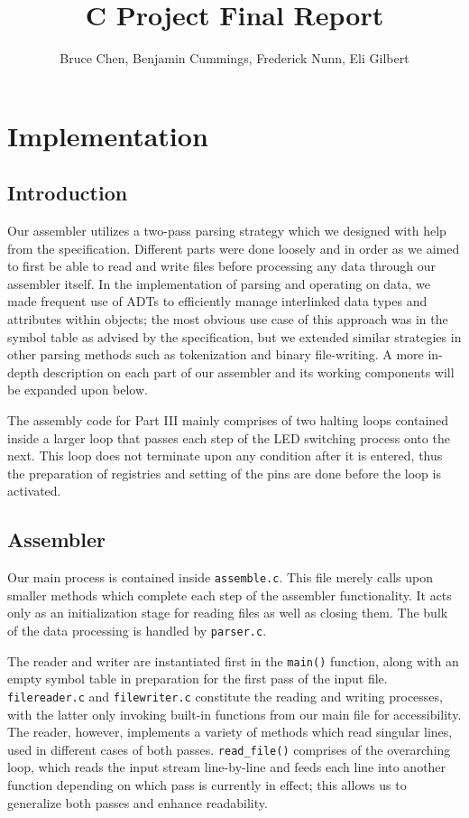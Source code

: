 \documentclass[11pt]{article}
\begin{document}
\title{C Project Final Report}
\author{Bruce Chen, Benjamin Cummings, Frederick Nunn, Eli Gilbert}

\maketitle

\section{Implementation}

\subsection{Introduction}

Our assembler utilizes a two-pass parsing strategy which we designed with help from the 
specification. Different parts were done loosely and in order as we aimed to first be able to read 
and write files before processing any data through our assembler itself. In the implementation 
of parsing and operating on data, we made frequent use of ADTs to efficiently manage interlinked 
data types and attributes within objects; the most obvious use case of this approach was in the 
symbol table as advised by the specification, but we extended similar strategies in other 
parsing methods such as tokenization and binary file-writing. A more in-depth description on 
each part of our assembler and its working components will be expanded upon below.

The assembly code for Part III mainly comprises of two halting loops contained inside a larger 
loop that passes each step of the LED switching process onto the next. This loop does not terminate 
upon any condition after it is entered, thus the preparation of registries and setting of the pins 
are done before the loop is activated.

\subsection{Assembler}

Our main process is contained inside \verb|assemble.c|. This file merely calls upon 
smaller methods which complete each step of the assembler functionality. It acts 
only as an initialization stage for reading files as well as closing them. The bulk 
of the data processing is handled by \verb|parser.c|.

The reader and writer are instantiated first in the \verb|main()| function, along with an empty 
symbol table in preparation for the first pass of the input file. \verb|filereader.c| and 
\verb|filewriter.c| constitute the reading and writing processes, with the latter
only invoking built-in functions from our main file for accessibility. The reader,
however, implements a variety of methods which read singular lines, used in different
cases of both passes. \verb|read_file()| comprises of the overarching loop, which
reads the input stream line-by-line and feeds each line into another function
depending on which pass is currently in effect; this allows us to generalize
both passes and enhance readability.
\end{document}
